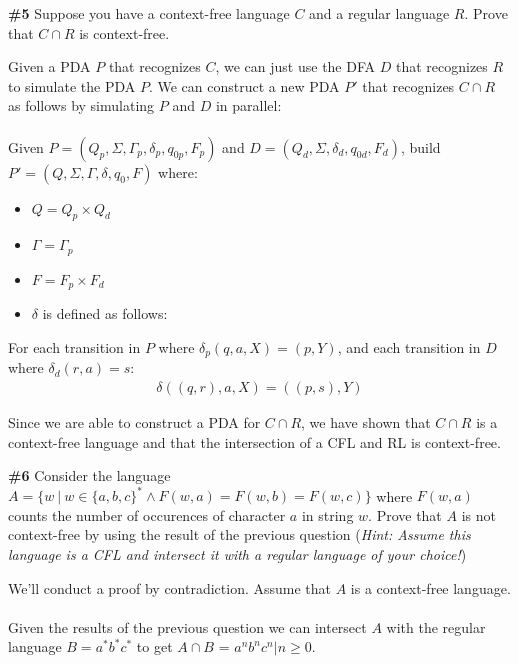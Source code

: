 \documentclass{article}
\newcommand{\problem}[1]{\textbf{\##1}}
\begin{document}
\pagebreak

\problem{5}
Suppose you have a context-free language $C$ and a regular language $R$. Prove that $C \cap R$ is context-free.

Given a PDA $P$ that recognizes $C$, we can just use the DFA $D$ that recognizes $R$ to simulate the PDA $P$. We can construct a new PDA $P'$ that recognizes $C \cap R$ as follows by simulating $P$ and $D$ in parallel:\\
\\
Given $P = (Q_p, \Sigma, \Gamma_p, \delta_p, q_{0p}, F_p)$ and $D = (Q_d, \Sigma, \delta_d, q_{0d}, F_d)$, build $P' = (Q, \Sigma, \Gamma, \delta, q_0, F)$ where:

\begin{itemize}
    \item $Q = Q_p \times Q_d$
    \item $\Gamma = \Gamma_p$
    \item $F = F_p \times F_d$
    \item $\delta$ is defined as follows:
\end{itemize}
\begin{center}
    For each transition in $P$ where $\delta_p(q,a,X) = (p,Y)$, and each transition in $D$ where $\delta_d(r,a) = s$:
    \begin{align*}
        \delta((q,r),a,X) = ((p,s),Y)
    \end{align*}
\end{center}

Since we are able to construct a PDA for $C \cap R$, we have shown that $C \cap R$ is a context-free language and that the intersection of a CFL and RL is context-free.

\pagebreak

\problem{6}
Consider the language $A = \{w \ | \ w \in \{a,b,c\}^* \wedge F(w,a) = F(w,b) = F(w,c)\}$ where $F(w,a)$ counts the number of occurences of character $a$ in string $w$. Prove that $A$ is not context-free by using the result of the previous question (\emph{Hint: Assume this language is a CFL and intersect it with a regular language of your choice!})

We'll conduct a proof by contradiction. Assume that $A$ is a context-free language.\\
\\
Given the results of the previous question we can intersect $A$ with the regular language $B = a^*b^*c^*$ to get $A \cap B$ = ${a^nb^nc^n | n \geq 0}$.\\
\end{document}
